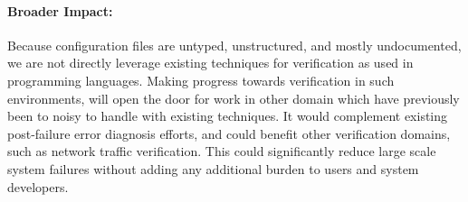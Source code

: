 \paragraph{Broader Impact:} 
Because configuration files are untyped, unstructured, and mostly undocumented, we are not directly leverage existing techniques for verification as used in programming languages.
Making progress towards verification in such environments, will open the door for work in other domain which have previously been to noisy to handle with existing techniques.
It would complement existing post-failure error diagnosis efforts, and could benefit other verification domains, such as network traffic verification. 
This could significantly reduce large scale system failures without adding any additional burden to users and system developers. 

